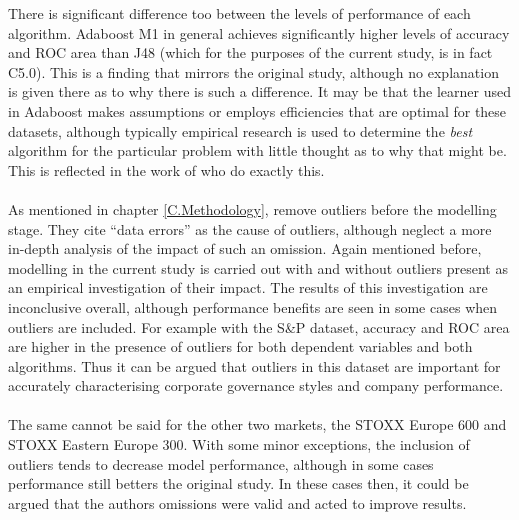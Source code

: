 There is significant difference too between the levels of performance of each algorithm. Adaboost M1 in general achieves significantly higher levels of accuracy and ROC area than J48 (which for the purposes of the current study, is in fact C5.0). This is a finding that mirrors the original study, although no explanation is given there as to why there is such a difference. It may be that the learner used in Adaboost makes assumptions or employs efficiencies that are optimal for these datasets, although typically empirical research is used to determine the {\it best} algorithm for the particular problem with little thought as to why that might be. This is reflected in the work of \cite{moldovan2015learning} who do exactly this. \\\\
As mentioned in chapter \ref{C.Methodology}, \cite{moldovan2015learning} remove outliers before the modelling stage. They cite ``data errors'' as the cause of outliers, although neglect a more in-depth analysis of the impact of such an omission. Again mentioned before, modelling in the current study is carried out with and without outliers present as an empirical investigation of their impact. The results of this investigation are inconclusive overall, although performance benefits are seen in some cases when outliers are included. For example with the S\&P dataset, accuracy and ROC area are higher in the presence of outliers for both dependent variables and both algorithms. Thus it can be argued that outliers in this dataset are important for accurately characterising corporate governance styles and company performance. \\\\The same cannot be said for the other two markets, the STOXX Europe 600 and STOXX Eastern Europe 300. With some minor exceptions, the inclusion of outliers tends to decrease model performance, although in some cases performance still betters the original study. In these cases then, it could be argued that the authors omissions were valid and acted to improve results.  \\\\
